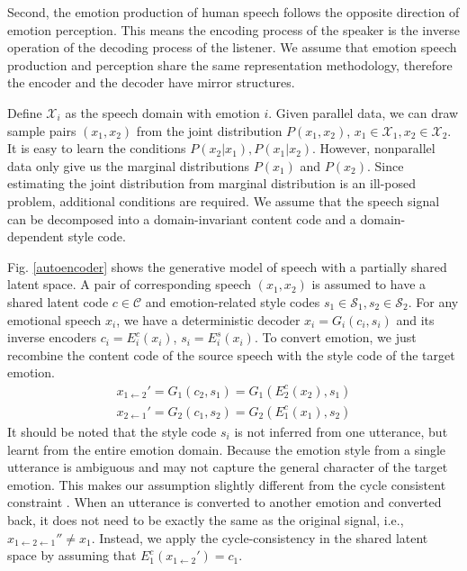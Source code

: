 \documentclass{article}
\begin{document}
Second, the emotion production of human speech follows the opposite direction of emotion perception. This means the encoding process of the speaker is the inverse operation of the decoding process of the listener. We assume that emotion speech production and perception share the same representation methodology, therefore the encoder and the decoder have mirror structures.

Define $\mathcal{X}_i$ as the speech domain with emotion $i$. Given parallel data, we can draw sample pairs $(x_1, x_2)$ from the joint distribution $P(x_1, x_2)$, $x_1 \in \mathcal{X}_1, x_2 \in \mathcal{X}_2$. It is easy to learn the conditions $P(x_2|x_1), P(x_1|x_2)$. However, nonparallel data only give us the marginal distributions $P(x_1)$ and $P(x_2)$. Since estimating the joint distribution from marginal distribution is an ill-posed problem, additional conditions are required. We assume that the speech signal can be decomposed into a domain-invariant content code and a domain-dependent style code.

Fig. \ref{autoencoder} shows the generative model of speech with a partially shared latent space. A pair of corresponding speech $(x_1, x_2)$ is assumed to have a shared latent code $c \in \mathcal{C}$ and emotion-related style codes $s_1 \in \mathcal{S}_1, s_2 \in \mathcal{S}_2$. For any emotional speech $x_i$, we have a deterministic decoder $x_i = G_i(c_i,s_i)$ and its inverse encoders $c_i = E_i^c(x_i)$, $s_i = E_i^s(x_i)$. To convert emotion, we just recombine the content code of the source speech with the style code of the target emotion.
\begin{equation}
\begin{aligned}
x_{1\leftarrow2}' = G_1(c_2, s_1) = G_1(E_2^c(x_2), s_1) \\
x_{2\leftarrow1}' = G_2(c_1, s_2) = G_2(E_1^c(x_1), s_2)
\end{aligned}
\end{equation}
It should be noted that the style code $s_i$ is not inferred from one utterance, but learnt from the entire emotion domain. Because the emotion style from a single utterance is ambiguous and may not capture the general character of the target emotion. This makes our assumption slightly different from the cycle consistent constraint \cite{Zhu_2017_ICCV}. When an utterance is converted to another emotion and converted back, it does not need to be exactly the same as the original signal, i.e., $x_{1\leftarrow2\leftarrow1}'' \neq x_1$. Instead, we apply the cycle-consistency in the shared latent space by assuming that $E_1^c(x_{1\leftarrow2}') = c_1$.
\end{document}
